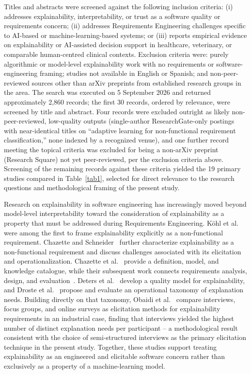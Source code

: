 \documentclass[pdflatex,sn-mathphys-num,Numbered]{sn-jnl}
\begin{document}
Titles and abstracts were screened against the following inclusion criteria: (i) addresses explainability, interpretability, or trust as a software quality or requirements concern; (ii) addresses Requirements Engineering challenges specific to AI-based or machine-learning-based systems; or (iii) reports empirical evidence on explainability or AI-assisted decision support in healthcare, veterinary, or comparable human-centred clinical contexts. Exclusion criteria were: purely algorithmic or model-level explainability work with no requirements or software-engineering framing; studies not available in English or Spanish; and non-peer-reviewed sources other than arXiv preprints from established research groups in the area. The search was executed on 5 September 2026 and returned approximately 2,860 records; the first 30 records, ordered by relevance, were screened by title and abstract. Four records were excluded outright as likely non-peer-reviewed, low-quality outputs (single-author ResearchGate-only postings with near-identical titles on ``adaptive learning for non-functional requirement classification,'' none indexed by a recognized venue), and one further record meeting the topical criteria was excluded for being a non-arXiv preprint (Research Square) not yet peer-reviewed, per the exclusion criteria above. Screening of the remaining records against these criteria yielded the 19 primary studies compared in Table~\ref{tab1}, selected for direct relevance to the research questions and methodological framing of the present study.

Research on explainability in software engineering has increasingly moved beyond model-level interpretability toward the consideration of explainability as a property that must be addressed during Requirements Engineering. Köhl et al.~\cite{kohl2019} were among the first to frame explainability explicitly as a non-functional requirement. Chazette and Schneider~\cite{chazette2020} further characterize explainability as a non-functional requirement and discuss challenges associated with its elicitation and operationalization. Chazette et al.~\cite{chazette2021} provide a definition, model, and knowledge catalogue, while their subsequent work connects requirements analysis, design, and evaluation~\cite{chazette2022}. Deters et al.~\cite{deters2024} develop a quality model for explainability, and Droste et al.~\cite{droste2025} propose and evaluate an operational taxonomy of explanation needs. Building directly on that taxonomy, Obaidi et al.~\cite{obaidi2025} compare interviews, focus groups, and online surveys as elicitation methods for explainability requirements in an industrial case, finding that interviews yielded the highest number of distinct explanation needs per participant -- a methodological result consistent with the choice of semi-structured interviews as the primary elicitation technique in the present study. Together, these studies support treating explainability as an engineered and elicitable software concern rather than exclusively as a property of a machine-learning model.
\end{document}
